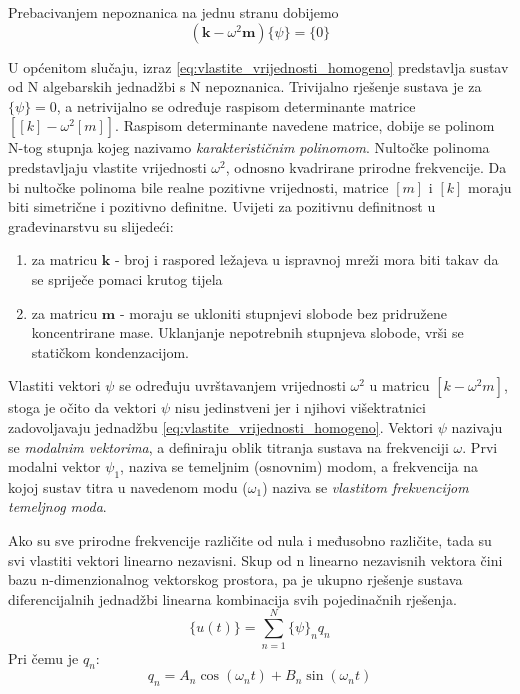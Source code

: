 \documentclass{rgn}
\newcommand\mm{\mathbf{m}}
\newcommand\kk{\mathbf{k}}
\begin{document}
Prebacivanjem nepoznanica na jednu stranu dobijemo
\begin{equation}\label{eq:vlastite_vrijednosti_homogeno}
    (\kk-\omega^2\mm)\{\psi\}=\{0\}
\end{equation}

U općenitom slučaju, izraz \eqref{eq:vlastite_vrijednosti_homogeno} predstavlja
sustav od N algebarskih jednadžbi s N nepoznanica. Trivijalno rješenje sustava je za
$\{\psi\}={0}$, a netrivijalno se određuje raspisom determinante matrice
$[[k]-\omega^2[m]]$. Raspisom determinante navedene matrice, dobije se polinom N-tog
stupnja kojeg nazivamo \textit{karakterističnim polinomom}. Nultočke polinoma
predstavljaju vlastite vrijednosti $\omega^2$, odnosno kvadrirane prirodne
frekvencije. Da bi nultočke polinoma bile realne pozitivne vrijednosti, matrice $[m]$
i $[k]$ moraju biti simetrične i pozitivno definitne. Uvijeti za pozitivnu
definitnost u građevinarstvu su slijedeći:
\begin{enumerate}
    \item za matricu $\kk$ - broj i raspored ležajeva u ispravnoj mreži mora biti
        takav da se spriječe pomaci krutog tijela
    \item za matricu $\mm$ - moraju se ukloniti stupnjevi slobode bez pridružene
        koncentrirane mase. Uklanjanje nepotrebnih stupnjeva slobode, vrši se
        statičkom kondenzacijom.
\end{enumerate}

Vlastiti vektori $\psi$ se određuju uvrštavanjem vrijednosti $\omega^2$ u matricu
$[k-\omega^2m]$, stoga je očito da vektori $\psi$ nisu jedinstveni jer i njihovi
višektratnici zadovoljavaju jednadžbu \eqref{eq:vlastite_vrijednosti_homogeno}.
Vektori $\psi$ nazivaju se \textit{modalnim vektorima}, a definiraju oblik titranja
sustava na frekvenciji $\omega$. Prvi modalni vektor $\psi_1$, naziva se temeljnim
(osnovnim) modom, a frekvencija na kojoj sustav titra u navedenom modu ($\omega_1$)
naziva se \textit{vlastitom frekvencijom temeljnog moda}.
\par

Ako su sve prirodne frekvencije različite od nula i međusobno različite, tada su svi
vlastiti vektori linearno nezavisni. Skup od n linearno nezavisnih vektora čini bazu
n-dimenzionalnog vektorskog prostora, pa je ukupno rješenje sustava diferencijalnih
jednadžbi linearna kombinacija svih pojedinačnih rješenja.
\begin{equation}\label{eq:opce_rjesenje_sustava}
    \{u(t)\}=\sum_{n=1}^N\{\psi\}_nq_n 
\end{equation}
Pri čemu je $q_n$:
\begin{equation}
    q_n=A_n\cos(\omega_n t) + B_n\sin(\omega_n t)
\end{equation}
\end{document}
